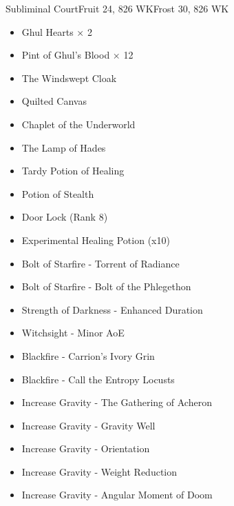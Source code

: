 \documentclass{article}
\begin{document}
\begin{adventure}{Subliminal Court}{Fruit 24, 826 WK}{Frost 30, 826 WK}
\begin{notes}
\begin{itemize}
  \item Ghul Hearts × 2
  \item Pint of Ghul’s Blood × 12
  \item The Windswept Cloak
  \item Quilted Canvas
  \item Chaplet of the Underworld
  \item The Lamp of Hades
  \item Tardy Potion of Healing
  \item Potion of Stealth
  \item Door Lock (Rank 8)
  \item Experimental Healing Potion (x10)
  \item Bolt of Starfire - Torrent of Radiance
  \item Bolt of Starfire - Bolt of the Phlegethon
  \item Strength of Darkness - Enhanced Duration
  \item Witchsight - Minor AoE
  \item Blackfire - Carrion's Ivory Grin
  \item Blackfire - Call the Entropy Locusts
  \item Increase Gravity - The Gathering of Acheron
  \item Increase Gravity - Gravity Well
  \item Increase Gravity - Orientation
  \item Increase Gravity - Weight Reduction
  \item Increase Gravity - Angular Moment of Doom
\end{itemize}
\end{notes}
  
\end{adventure}
  
\end{document}
